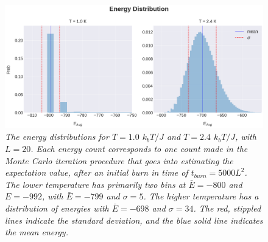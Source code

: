 \documentclass[%
reprint,nofootinbib,
amsmath,amssymb,
aps,
]{revtex4-1}
\begin{document}
\onecolumngrid 

\vspace{35mm}
\begin{figure}[H]
	\includegraphics[width = \textwidth]{Figures/Plot4E.png} 
	\caption{ \label{4E} \textit{The energy distributions for $T = 1.0$ $k_bT/J$ and $T = 2.4$ $k_bT/J$, with $L=20$. Each energy count corresponds to one count made in the Monte Carlo iteration procedure that goes into estimating the expectation value, after an initial burn in time of $t_{burn} = 5000L^2$. The lower temperature has primarily two bins at $\bar{E} = -800$ and $E = -992$, with $\bar{E}= -799$ and $\sigma = 5$. The higher temperature has a distribution of energies with $\bar{E}=  -698$ and $\sigma = 34$. The red, stippled lines indicate the standard deviation, and the blue solid line indicates the mean energy.  \vspace{25mm}}}
\end{figure} 

\twocolumngrid \noindent 
\end{document}

